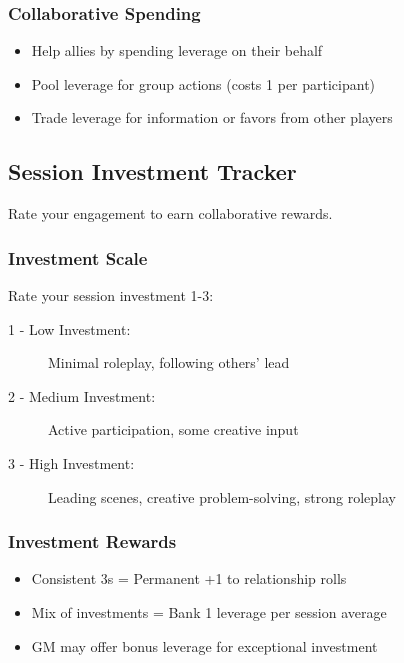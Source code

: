 \subsubsection{Collaborative Spending}

\begin{itemize}
\item Help allies by spending leverage on their behalf
\item Pool leverage for group actions (costs 1 per participant)
\item Trade leverage for information or favors from other players
\end{itemize}

\subsection{Session Investment Tracker}

Rate your engagement to earn collaborative rewards.

\subsubsection{Investment Scale}

Rate your session investment 1-3:
\begin{description}
\item[1 - Low Investment:] Minimal roleplay, following others' lead
\item[2 - Medium Investment:] Active participation, some creative input
\item[3 - High Investment:] Leading scenes, creative problem-solving, strong roleplay
\end{description}

\subsubsection{Investment Rewards}

\begin{itemize}
\item Consistent 3s = Permanent +1 to relationship rolls
\item Mix of investments = Bank 1 leverage per session average
\item GM may offer bonus leverage for exceptional investment
\end{itemize}

